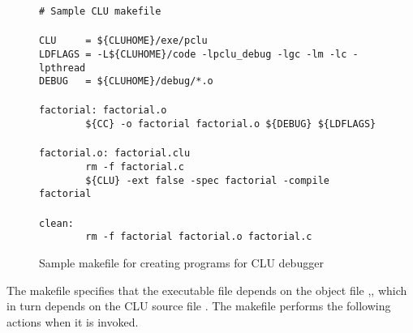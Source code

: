 \begin{figure}[hbt]
\small
\begin{boxdisplay}
\verb`# Sample CLU makefile`\\
\verb``\\
\verb`CLU     = ${CLUHOME}/exe/pclu                                   `\\
\verb`LDFLAGS = -L${CLUHOME}/code -lpclu_debug -lgc -lm -lc -lpthread `\\
\verb`DEBUG   = ${CLUHOME}/debug/*.o                                  `\\
\verb``\\
\verb`factorial: factorial.o`\\
\verb`        ${CC} -o factorial factorial.o ${DEBUG} ${LDFLAGS}`\\
\verb``\\
\verb`factorial.o: factorial.clu`\\
\verb`        rm -f factorial.c`\\
\verb`        ${CLU} -ext false -spec factorial -compile factorial`\\
\verb``\\
\verb`clean:`\\
\verb`        rm -f factorial factorial.o factorial.c`\\
\end{boxdisplay}
\caption{Sample makefile for creating programs for CLU debugger}
\label{makeA}
\end{figure}

The makefile specifies that the executable file  depends on
the object file ,, which in turn depends on the CLU source
file .  The makefile performs the following actions when
it is invoked.

